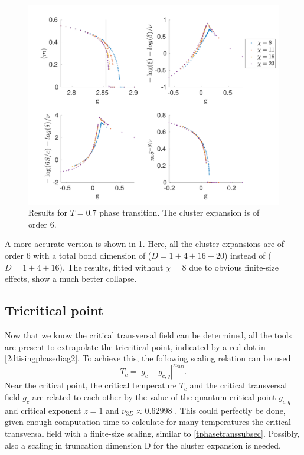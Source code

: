 \begin{figure}[h!]
    \center
    \includegraphics[width=\textwidth]{Figuren/phasediag/t07/zoomed2.pdf}
    \caption{Results for $T=0.7$ phase transition. The cluster expansion is of order 6.}
    \label{fig:phase:t07:full2}
\end{figure}

A more accurate version is shown in \cref{fig:phase:t07:full2}. Here, all the cluster expansions are of order 6 with a total bond dimension of ($D = 1+4+16+20$) instead of ($D = 1+4+16$). The results, fitted without $\chi=8$ due to obvious finite-size effects, show a much better collapse.

\subsection{Tricritical point}\label{subsec:tricrit}

Now that we know the critical transversal field can be determined, all the tools are present to extrapolate the tricritical point, indicated by a red dot in \cref{2dtisingphasediag2}. To achieve this, the following scaling relation can be used
\begin{equation}
    T_c = \left| g_c-g_{c,q} \right|^{z \nu_{3D}} .
\end{equation}
Near the critical point, the critical temperature $T_c$ and the critical transversal field $g_c$ are related to each other by the value of the quantum critical point $g_{c,q}$ and critical exponent $z=1$ and $\nu_{3D} \approx 0.62998$ \cite{Hesselmann2016}. This could perfectly be done, given enough computation time to calculate for many temperatures the critical transversal field with a finite-size scaling, similar to \cref{tphasetranssubsec}. Possibly, also a scaling in truncation dimension D for the cluster expansion is needed.

